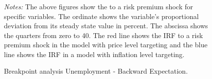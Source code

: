 \documentclass[11pt, a4paper, leqno]{article}
\begin{document}
\begin{figure}[ht!]
	\caption{Breakpoint analysis Unemployment - Backward Expectation.}
	\centering
    	\bigskip
	\begin{minipage}{\textwidth}%
		\footnotesize\setlength{\baselineskip}{11pt}%
		\bigskip \textit{Notes:} The above figures show the  to a risk premium shock for specific variables. The ordinate shows the variable's proportional deviation from its steady state value in percent. The abscissa shows the quarters from zero to 40. The red line shows the IRF to a risk premium shock in the model with price level targeting and the blue line shows the IRF in a model with inflation level targeting.
	\end{minipage}
\end{figure}
\end{document}
